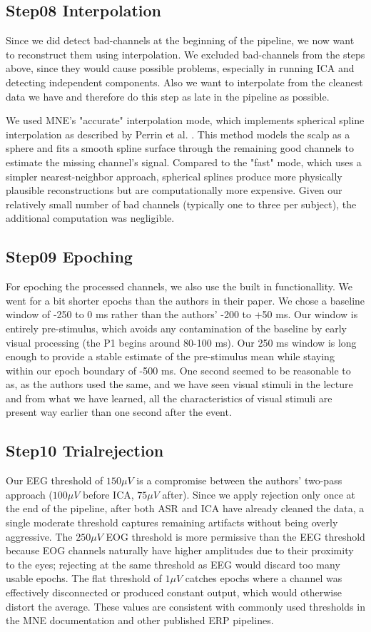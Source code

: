 \documentclass{scrartcl}
\begin{document}
\subsection{Step08 Interpolation}
Since we did detect bad-channels at the beginning of the pipeline, we now want to reconstruct them using interpolation. We excluded bad-channels from the steps above, since they would cause possible problems, especially in running ICA and detecting independent components. Also we want to interpolate from the cleanest data we have and therefore do this step as late in the pipeline as possible.

We used MNE's "accurate" interpolation mode, which implements spherical spline interpolation as described by Perrin et al. \cite{interpolation}. This method models the scalp as a sphere and fits a smooth spline surface through the remaining good channels to estimate the missing channel's signal. Compared to the "fast" mode, which uses a simpler nearest-neighbor approach, spherical splines produce more physically plausible reconstructions but are computationally more expensive. Given our relatively small number of bad channels (typically one to three per subject), the additional computation was negligible. 

\subsection{Step09 Epoching}
For epoching the processed channels, we also use the built in functionallity. We went for a bit shorter epochs than the authors in their paper. We chose a baseline window of -250 to 0 ms rather than the authors' -200 to +50 ms. Our window is entirely pre-stimulus, which avoids any contamination of the baseline by early visual processing (the P1 begins around 80-100 ms). Our 250 ms window is long enough to provide a stable estimate of the pre-stimulus mean while staying within our epoch boundary of -500 ms.
One second seemed to be reasonable to as, as the authors used the same, and we have seen visual stimuli in the lecture and from what we have learned, all the characteristics of visual stimuli are present way earlier than one second after the event.

\subsection{Step10 Trialrejection}
Our EEG threshold of $150 \mu V$ is a compromise between the authors' two-pass approach ($100 \mu V$ before ICA, $75 \mu V$ after). Since we apply rejection only once at the end of the pipeline, after both ASR and ICA have already cleaned the data, a single moderate threshold captures remaining artifacts without being overly aggressive. The $250 \mu V$ EOG threshold is more permissive than the EEG threshold because EOG channels naturally have higher amplitudes due to their proximity to the eyes; rejecting at the same threshold as EEG would discard too many usable epochs. The flat threshold of $1 \mu V$ catches epochs where a channel was effectively disconnected or produced constant output, which would otherwise distort the average. These values are consistent with commonly used thresholds in the MNE documentation and other published ERP pipelines.
\end{document}
